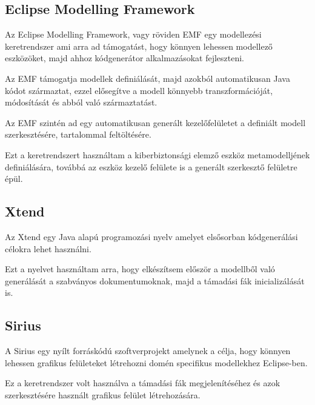 \subsection{Eclipse Modelling Framework}

Az Eclipse Modelling Framework, vagy röviden EMF egy modellezési keretrendszer ami arra ad támogatást, hogy könnyen lehessen modellező eszközöket, majd ahhoz kódgenerátor alkalmazásokat fejleszteni.

Az EMF támogatja modellek definiálását, majd azokból automatikusan Java kódot származtat, ezzel elősegítve a modell könnyebb transzformációját, módosítását és abból való származtatást.

Az EMF szintén ad egy automatikusan generált kezelőfelületet a definiált modell szerkesztésére, tartalommal feltöltésére.

Ezt a keretrendszert használtam a kiberbiztonsági elemző eszköz metamodelljének definiálására, továbbá az eszköz kezelő felülete is a generált szerkesztő felületre épül.

\subsection{Xtend}

Az Xtend egy Java alapú programozási nyelv amelyet elsősorban kódgenerálási célokra lehet használni.

Ezt a nyelvet használtam arra, hogy elkészítsem először a modellből való generálását a szabványos dokumentumoknak, majd a támadási fák inicializálását is.

\subsection{Sirius}

A Sirius egy nyílt forráskódú szoftverprojekt amelynek a célja, hogy könnyen lehessen grafikus felületeket létrehozni domén specifikus modellekhez Eclipse-ben.

Ez a keretrendszer volt használva a támadási fák megjelenítéséhez és azok szerkesztésére használt grafikus felület létrehozására.